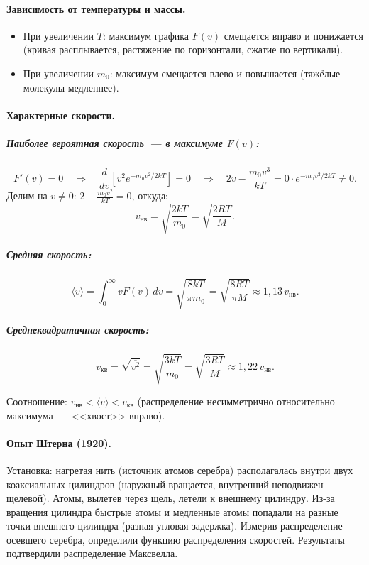 \documentclass[12pt]{article}
\begin{document}
\paragraph{Зависимость от температуры и массы.}
\begin{itemize}
	\item При увеличении $T$: максимум графика $F(v)$ смещается вправо и понижается (кривая расплывается, растяжение по горизонтали, сжатие по вертикали).
	\item При увеличении $m_0$: максимум смещается влево и повышается (тяжёлые молекулы медленнее).
\end{itemize}

\paragraph{Характерные скорости.}

\subparagraph{Наиболее вероятная скорость~--- в максимуме $F(v)$:}
\[
	F'(v) = 0 \quad \Longrightarrow \quad \frac{d}{dv}\left[v^2 e^{-m_0 v^2/2kT}\right] = 0
	\quad \Longrightarrow \quad 2v - \frac{m_0 v^3}{kT} = 0 \cdot e^{-m_0 v^2/2kT} \neq 0.
\]
Делим на $v \neq 0$: $2 - \frac{m_0 v^2}{kT} = 0$, откуда:
\[
	v_{\text{нв}} = \sqrt{\frac{2kT}{m_0}} = \sqrt{\frac{2RT}{M}}.
\]

\subparagraph{Средняя скорость:}
\[
	\langle v \rangle = \int_0^\infty v F(v)\,dv = \sqrt{\frac{8kT}{\pi m_0}} = \sqrt{\frac{8RT}{\pi M}} \approx 1{,}13 \, v_{\text{нв}}.
\]

\subparagraph{Среднеквадратичная скорость:}
\[
	v_{\text{кв}} = \sqrt{\overline{v^2}} = \sqrt{\frac{3kT}{m_0}} = \sqrt{\frac{3RT}{M}} \approx 1{,}22 \, v_{\text{нв}}.
\]

Соотношение: $v_{\text{нв}} < \langle v \rangle < v_{\text{кв}}$ (распределение несимметрично относительно максимума~--- <<хвост>> вправо).

\paragraph{Опыт Штерна (1920).}
Установка: нагретая нить (источник атомов серебра) располагалась внутри двух коаксиальных цилиндров (наружный вращается, внутренний неподвижен~--- щелевой). Атомы, вылетев через щель, летели к внешнему цилиндру. Из-за вращения цилиндра быстрые атомы и медленные атомы попадали на разные точки внешнего цилиндра (разная угловая задержка). Измерив распределение осевшего серебра, определили функцию распределения скоростей. Результаты подтвердили распределение Максвелла.
\end{document}
